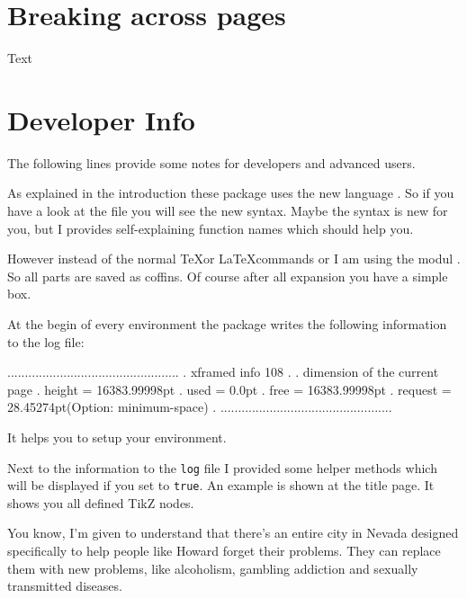 \documentclass[openany,12pt,tocdepth=3]{ltx-md}
\begin{document}
\chapter{Breaking across pages}\label{chap:break}
Text 

\chapter{Developer Info}\label{chap:developer-info}

The following lines provide some notes for developers and advanced users. 

As explained in the introduction these package uses the new
language . So if you have a look at the  file
you will see the new syntax. Maybe the syntax is new for you, but
I provides self-explaining function names which should help you.

However instead of the normal \TeX or \LaTeX  commands  or 
I am using the modul . So all parts are saved as coffins. Of course after
all expansion you have a simple box.

At the begin of every environment the package writes the following information 
to the log file:
\begin{ltxexample}[caption={Info dimension},result=false,]
.................................................
. xframed info 108
. 
.  dimension of the current page
.  height = 16383.99998pt
.  used = 0.0pt
.  free = 16383.99998pt
.  request = 28.45274pt(Option: minimum-space)
. 
.................................................
\end{ltxexample}

It helps you to setup your environment. 

Next to the information to the \texttt{log} file
I provided some helper methods which will be displayed
if you set  to \texttt{true}.
An example is shown at the title page. It shows you all
defined TikZ nodes.


\begin{ltxexample}[caption={Example \Opt{developer-info}},result=true,]
\begin{xframed}[developer-info=true,margin=1cm,
  first-title={Sheldon Cooper Quotes},
  last-foot={End Sheldon Cooper Quotes}]
You know, I'm given to understand that there's an entire city in Nevada designed specifically to help people like Howard forget their problems. They can replace them with new problems, like alcoholism, gambling addiction and sexually transmitted diseases.   
\end{xframed}
\end{ltxexample}
\end{document}
